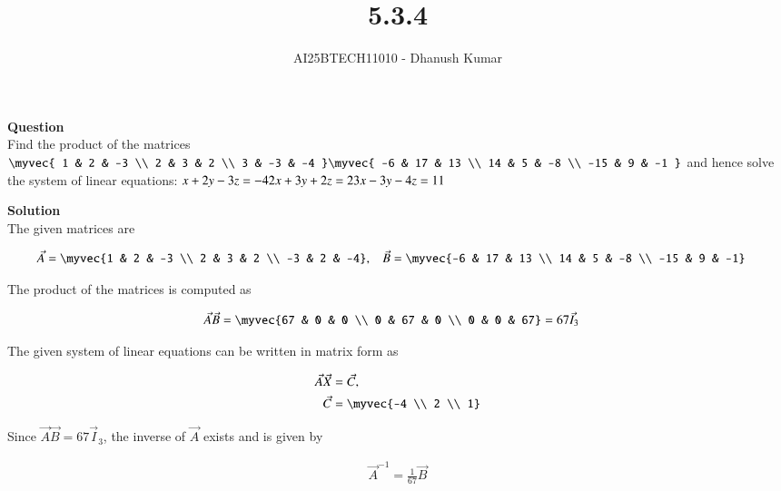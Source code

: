 \documentclass[journal]{IEEEtran}
\begin{document}
\title{5.3.4}
\author{AI25BTECH11010 - Dhanush Kumar}
\maketitle
\renewcommand{\thefigure}{\theenumi}
\renewcommand{\thetable}{\theenumi}

\textbf{Question}\\

\noindent
Find the product of the matrices 
$\myvec{
1 & 2 & -3 \\
2 & 3 & 2 \\
3 & -3 & -4
}
\myvec{
-6 & 17 & 13 \\
14 & 5 & -8 \\
-15 & 9 & -1
}$
and hence solve the system of linear equations:
$
x + 2y - 3z = -4 \\
2x + 3y + 2z = 2 \\
3x - 3y - 4z = 11
$

\textbf{Solution}\\
\noindent
The given matrices are

\begin{align}
	\vec{A} &= \myvec{1 & 2 & -3 \\ 2 & 3 & 2 \\ -3 & 2 & -4}, &
	\vec{B} &= \myvec{-6 & 17 & 13 \\ 14 & 5 & -8 \\ -15 & 9 & -1}
\end{align}

The product of the matrices is computed as

\begin{align}
	\vec{A}\vec{B} &= \myvec{67 & 0 & 0 \\ 0 & 67 & 0 \\ 0 & 0 & 67} = 67 \vec{I}_3
\end{align}

The given system of linear equations can be written in matrix form as

\begin{align}
	\vec{A}\vec{X} &= \vec{C}, \\
\vec{C} &= \myvec{-4 \\ 2 \\ 1}
\end{align}

Since $\vec{A}\vec{B} = 67 \vec{I}_3$, the inverse of $\vec{A}$ exists and is given by

\begin{align}
	\vec{A}^{-1} = \frac{1}{67}\vec{B}
\end{align}
\end{document}

